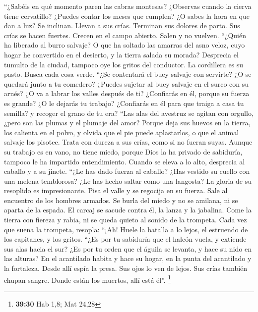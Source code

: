 \begin{paracol}{2}
 ``¿Sabéis en qué momento paren las cabras montesas?
¿Observas cuando la cierva tiene cervatillo?  ¿Puedes
contar los meses que cumplen? ¿O sabes la hora en que dan a luz?
 Se inclinan. Llevan a sus crías. Terminan sus dolores de
parto.  Sus crías se hacen fuertes. Crecen en el campo
abierto. Salen y no vuelven.  ``¿Quién ha liberado al
burro salvaje? O que ha soltado las amarras del asno veloz,
 cuyo hogar he convertido en el desierto, y la tierra
salada su morada?  Desprecia el tumulto de la ciudad,
tampoco oye los gritos del conductor.  La cordillera es su
pasto. Busca cada cosa verde.  ``¿Se contentará el buey
salvaje con servirte? ¿O se quedará junto a tu comedero? 
¿Puedes sujetar al buey salvaje en el surco con su arnés? ¿O va a labrar
los valles después de ti?  ¿Confiarás en él, porque su
fuerza es grande? ¿O le dejarás tu trabajo?  ¿Confiarás
en él para que traiga a casa tu semilla? y recoger el grano de tu era?
 ``Las alas del avestruz se agitan con orgullo, ¿pero son
las plumas y el plumaje del amor?  Porque deja sus huevos
en la tierra, los calienta en el polvo,  y olvida que el
pie puede aplastarlos, o que el animal salvaje los pisotee.
 Trata con dureza a sus crías, como si no fueran suyas.
Aunque su trabajo es en vano, no tiene miedo,  porque
Dios la ha privado de sabiduría, tampoco le ha impartido entendimiento.
 Cuando se eleva a lo alto, desprecia al caballo y a su
jinete.  ``¿Le has dado fuerza al caballo? ¿Has vestido
su cuello con una melena temblorosa?  ¿Le has hecho
saltar como una langosta? La gloria de su resoplido es impresionante.
 Pisa el valle y se regocija en su fuerza. Sale al
encuentro de los hombres armados.  Se burla del miedo y
no se amilana, ni se aparta de la espada.  El carcaj se
sacude contra él, la lanza y la jabalina.  Come la tierra
con fiereza y rabia, ni se queda quieto al sonido de la trompeta.
 Cada vez que suena la trompeta, resopla: ``¡Ah! Huele la
batalla a lo lejos, el estruendo de los capitanes, y los gritos.
 ``¿Es por tu sabiduría que el halcón vuela, y extiende
sus alas hacia el sur?  ¿Es por tu orden que el águila se
levanta, y hace su nido en las alturas?  En el acantilado
habita y hace su hogar, en la punta del acantilado y la fortaleza.
 Desde allí espía la presa. Sus ojos lo ven de lejos.
 Sus crías también chupan sangre. Donde están los
muertos, allí está él''. \footnote{\textbf{39:30} Hab 1,8; Mat 24,28}


\end{paracol}
